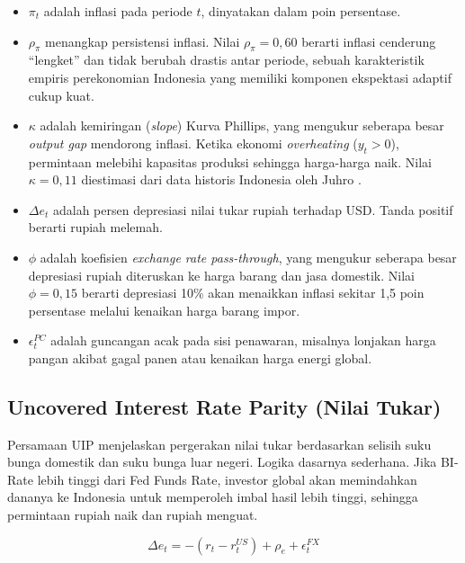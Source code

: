 \begin{itemize}
    \item $\pi_t$ adalah inflasi pada periode $t$, dinyatakan dalam poin persentase.
    \item $\rho_\pi$ menangkap persistensi inflasi. Nilai $\rho_\pi = 0,60$ berarti inflasi cenderung ``lengket'' dan tidak berubah drastis antar periode, sebuah karakteristik empiris perekonomian Indonesia yang memiliki komponen ekspektasi adaptif cukup kuat.
    \item $\kappa$ adalah kemiringan (\textit{slope}) Kurva Phillips, yang mengukur seberapa besar \textit{output gap} mendorong inflasi. Ketika ekonomi \textit{overheating} ($y_t > 0$), permintaan melebihi kapasitas produksi sehingga harga-harga naik. Nilai $\kappa = 0,11$ diestimasi dari data historis Indonesia oleh Juhro \cite{juhro2004}.
    \item $\Delta e_t$ adalah persen depresiasi nilai tukar rupiah terhadap USD. Tanda positif berarti rupiah melemah.
    \item $\phi$ adalah koefisien \textit{exchange rate pass-through}, yang mengukur seberapa besar depresiasi rupiah diteruskan ke harga barang dan jasa domestik. Nilai $\phi = 0,15$ berarti depresiasi 10\% akan menaikkan inflasi sekitar 1,5 poin persentase melalui kenaikan harga barang impor.
    \item $\epsilon_t^{PC}$ adalah guncangan acak pada sisi penawaran, misalnya lonjakan harga pangan akibat gagal panen atau kenaikan harga energi global.
\end{itemize}

\subsection{Uncovered Interest Rate Parity (Nilai Tukar)}

Persamaan UIP menjelaskan pergerakan nilai tukar berdasarkan selisih suku bunga domestik dan suku bunga luar negeri. Logika dasarnya sederhana. Jika BI-Rate lebih tinggi dari Fed Funds Rate, investor global akan memindahkan dananya ke Indonesia untuk memperoleh imbal hasil lebih tinggi, sehingga permintaan rupiah naik dan rupiah menguat.

\[
    \Delta e_t = -\left( r_t - r_t^{US} \right) + \rho_e + \epsilon_t^{FX}
\]

